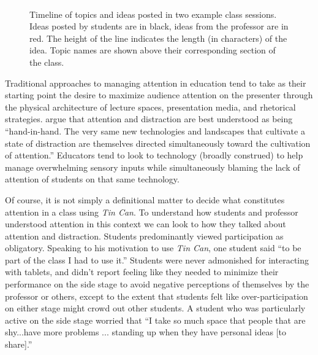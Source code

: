 \begin{figure}[t]
\centering
\includegraphics{figures/tincan/timeline.pdf}
\caption{Timeline of topics and ideas posted in two example class sessions. Ideas posted by students are in black, ideas from the professor are in red. The height of the line indicates the length (in characters) of the idea. Topic names are shown above their corresponding section of the class.}
\label{f:class_timelines}
\end{figure}

Traditional approaches to managing attention in education tend to take as their starting point the desire to maximize audience attention on the presenter through the physical architecture of lecture spaces, presentation media, and rhetorical strategies. \citet{Gordon:2009us} argue that attention and distraction are best understood as being ``hand-in-hand. The very same new technologies and landscapes that cultivate a state of distraction are themselves directed simultaneously toward the cultivation of attention.'' Educators tend to look to technology (broadly construed) to help manage overwhelming sensory inputs while simultaneously blaming the lack of attention of students on that same technology.


Of course, it is not simply a definitional matter to decide what constitutes attention in a class using \emph{Tin Can}. To understand how students and professor understood attention in this context we can look to how they talked about attention and distraction. Students predominantly viewed participation as obligatory. Speaking to his motivation to use \emph{Tin Can}, one student said ``to be part of the class I had to use it.'' Students were never admonished for interacting with tablets, and didn't report feeling like they needed to minimize their performance on the side stage to avoid negative perceptions of themselves by the professor or others, except to the extent that students felt like over-participation on either stage might crowd out other students. A student who was particularly active on the side stage worried that ``I take so much space that people that are shy...have more problems ... standing up when they have personal ideas [to share].''

